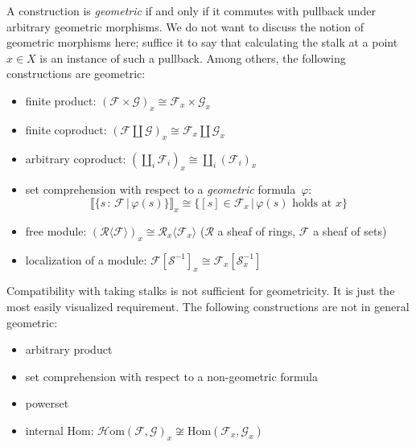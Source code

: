 \documentclass[10pt,reqno,a4paper]{amsbook}
\theoremstyle{definition}
\theoremstyle{plain}
\theoremstyle{remark}
\newcommand{\F}{\mathcal{F}}
\renewcommand{\G}{\mathcal{G}}
\newcommand{\R}{\mathcal{R}}
\renewcommand{\S}{\mathcal{S}}
\newcommand{\Hom}{\mathrm{Hom}}
\newcommand{\HOM}{\mathcal{H}\mathrm{om}}
\newcommand{\?}{\,{:}\,}
\renewcommand{\_}{\mathpunct{.}\,}
\newcommand{\brak}[1]{{\llbracket{#1}\rrbracket}}
\begin{document}
A construction is \emph{geometric} if and only if it commutes with pullback
under arbitrary geometric morphisms. We do not want to discuss the notion of
geometric morphisms here; suffice it to say that calculating the stalk at a
point~$x \in X$ is an instance of such a pullback. Among others, the following
constructions are geometric:
\begin{itemize}
\item finite product: $(\F \times \G)_x \cong \F_x \times \G_x$
\item finite coproduct: $(\F \amalg \G)_x \cong \F_x \amalg \G_x$
\item arbitrary coproduct: $(\coprod_i \F_i)_x \cong \coprod_i (\F_i)_x$
\item set comprehension with respect to a \emph{geometric} formula~$\varphi$:
\[ \brak{\{ s\?\F \,|\, \varphi(s) \}}_x \cong \{ [s]\in\F_x \,|\,
\text{$\varphi(s)$ holds at $x$} \} \]
\item free module: $(\R\langle \F \rangle)_x \cong \R_x\langle \F_x
\rangle$ ($\R$ a sheaf of rings, $\F$ a sheaf of sets)
\item localization of a module: $\F[\S^{-1}]_x \cong \F_x[\S_x^{-1}]$
\end{itemize}
Compatibility with taking stalks is not sufficient for geometricity.
It is just the most easily visualized requirement.
The following constructions are not in general geometric:
\begin{itemize}
\item arbitrary product
\item set comprehension with respect to a non-geometric formula
\item powerset
\item internal Hom: $\HOM(\F,\G)_x \not\cong \Hom(\F_x,\G_x)$
\end{itemize}
\end{document}
